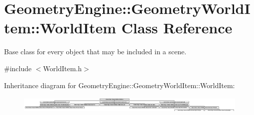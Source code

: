 \hypertarget{class_geometry_engine_1_1_geometry_world_item_1_1_world_item}{}\section{Geometry\+Engine\+::Geometry\+World\+Item\+::World\+Item Class Reference}
\label{class_geometry_engine_1_1_geometry_world_item_1_1_world_item}


Base class for every object that may be included in a scene.  




{\ttfamily \#include $<$World\+Item.\+h$>$}

Inheritance diagram for Geometry\+Engine\+::Geometry\+World\+Item\+::World\+Item\+:\begin{figure}[H]
\begin{center}
\leavevmode
\includegraphics[height=0.835073cm]{class_geometry_engine_1_1_geometry_world_item_1_1_world_item}
\end{center}
\end{figure}
